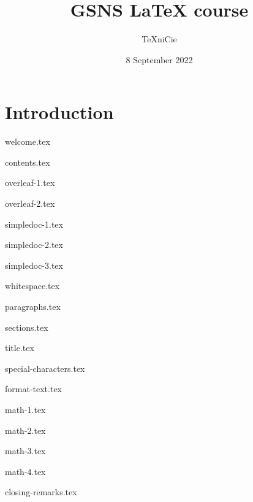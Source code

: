 \documentclass{../../cursuspresentatie}
\title{GSNS \LaTeX{} course}
\author{\TeX niCie}
\date{8 September 2022}
\def\importslide#1#2{%
	{#2}
}
\begin{document}
\section{Introduction}
\importslide{beginners}{welcome.tex}
\importslide{beginners}{contents.tex}

\importslide{beginners}{overleaf-1.tex}
\importslide{beginners}{overleaf-2.tex}


\importslide{beginners}{simpledoc-1.tex}
\importslide{beginners}{simpledoc-2.tex}
\importslide{beginners}{simpledoc-3.tex}

\importslide{beginners}{whitespace.tex}
\importslide{beginners}{paragraphs.tex}



\importslide{beginners}{sections.tex}
\importslide{beginners}{title.tex}


\importslide{beginners}{special-characters.tex}

\importslide{beginners}{format-text.tex}


\importslide{beginners}{math-1.tex}

\importslide{beginners}{math-2.tex}


\importslide{beginners}{math-3.tex}

\importslide{beginners}{math-4.tex}


\importslide{beginners}{closing-remarks.tex}
	
\end{document}
